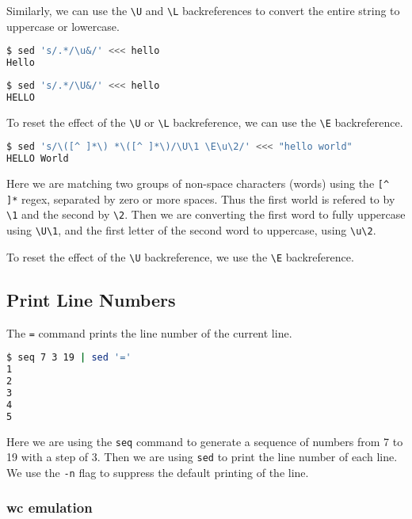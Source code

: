 Similarly, we can use the \lstinline|\U| and \lstinline|\L| backreferences to convert the entire string
to uppercase or lowercase.

\begin{lstlisting}[language=bash]
$ sed 's/.*/\u&/' <<< hello
Hello
\end{lstlisting}

\begin{lstlisting}[language=bash]
$ sed 's/.*/\U&/' <<< hello
HELLO
\end{lstlisting}

To reset the effect of the \lstinline|\U| or \lstinline|\L| backreference, we can use the \lstinline|\E| backreference.

\begin{lstlisting}[language=bash]
$ sed 's/\([^ ]*\) *\([^ ]*\)/\U\1 \E\u\2/' <<< "hello world"
HELLO World
\end{lstlisting}

Here we are matching two groups of non-space characters (words)
using the \lstinline|[^ ]*| regex,
separated by zero or more spaces.
Thus the first world is refered to by \lstinline|\1| and the second by \lstinline|\2|.
Then we are converting the first word to fully uppercase
using \lstinline|\U\1|,
and the first letter of the second word to uppercase,
using \lstinline|\u\2|.

To reset the effect of the \lstinline|\U| backreference, we use the \lstinline|\E| backreference.


\subsection{Print Line Numbers}

The \lstinline|=| command prints the line number of the current line.

\begin{lstlisting}[language=bash]
$ seq 7 3 19 | sed '='
1
2
3
4
5
\end{lstlisting}

Here we are using the \lstinline|seq| command to generate a sequence of numbers from 7 to 19 with a step of 3.
Then we are using \lstinline|sed| to print the line number of each line.
We use the \lstinline|-n| flag to suppress the default printing of the line.

\subsubsection{wc emulation}

